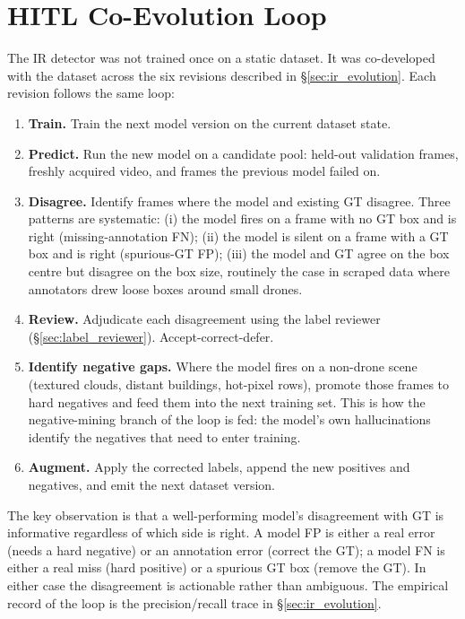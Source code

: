 \documentclass[12pt,a4paper,oneside,openright]{book}
\begin{document}
\section{HITL Co-Evolution Loop}
\label{sec:hitl_ir}

The IR detector was not trained once on a static dataset. It was co-developed with the dataset across the six revisions described in \S\ref{sec:ir_evolution}. Each revision follows the same loop:

\begin{enumerate}
    \item \textbf{Train.} Train the next model version on the current dataset state.
    \item \textbf{Predict.} Run the new model on a candidate pool: held-out validation frames, freshly acquired video, and frames the previous model failed on.
    \item \textbf{Disagree.} Identify frames where the model and existing GT disagree. Three patterns are systematic: (i) the model fires on a frame with no GT box and is right (missing-annotation FN); (ii) the model is silent on a frame with a GT box and is right (spurious-GT FP); (iii) the model and GT agree on the box centre but disagree on the box size, routinely the case in scraped data where annotators drew loose boxes around small drones.
    \item \textbf{Review.} Adjudicate each disagreement using the label reviewer (\S\ref{sec:label_reviewer}). Accept-correct-defer.
    \item \textbf{Identify negative gaps.} Where the model fires on a non-drone scene (textured clouds, distant buildings, hot-pixel rows), promote those frames to hard negatives and feed them into the next training set. This is how the negative-mining branch of the loop is fed: the model's own hallucinations identify the negatives that need to enter training.
    \item \textbf{Augment.} Apply the corrected labels, append the new positives and negatives, and emit the next dataset version.
\end{enumerate}

The key observation is that a well-performing model's disagreement with GT is informative regardless of which side is right. A model FP is either a real error (needs a hard negative) or an annotation error (correct the GT); a model FN is either a real miss (hard positive) or a spurious GT box (remove the GT). In either case the disagreement is actionable rather than ambiguous. The empirical record of the loop is the precision/recall trace in \S\ref{sec:ir_evolution}.
\end{document}
